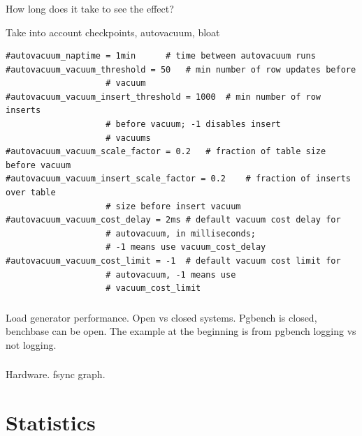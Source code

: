 \documentclass[usenames,dvipsnames, 18pt, compress, aspectratio=169]{beamer}
\begin{document}
\begin{frame}[fragile]{}
    \frametitle{}
    \begin{center}
        How long does it take to see the effect?

        Take into account checkpoints, autovacuum, bloat

        \begin{verbatim}
#autovacuum_naptime = 1min		# time between autovacuum runs
#autovacuum_vacuum_threshold = 50	# min number of row updates before
                    # vacuum
#autovacuum_vacuum_insert_threshold = 1000	# min number of row inserts
                    # before vacuum; -1 disables insert
                    # vacuums
#autovacuum_vacuum_scale_factor = 0.2	# fraction of table size before vacuum
#autovacuum_vacuum_insert_scale_factor = 0.2	# fraction of inserts over table
                    # size before insert vacuum
#autovacuum_vacuum_cost_delay = 2ms	# default vacuum cost delay for
                    # autovacuum, in milliseconds;
                    # -1 means use vacuum_cost_delay
#autovacuum_vacuum_cost_limit = -1	# default vacuum cost limit for
                    # autovacuum, -1 means use
                    # vacuum_cost_limit
        \end{verbatim}

    \end{center}
\end{frame}

\begin{frame}
    \frametitle{}
    \begin{center}
        Load generator performance. Open vs closed systems. Pgbench is closed,
        benchbase can be open. The example at the beginning is from pgbench
        logging vs not logging.
    \end{center}
\end{frame}

\begin{frame}
    \frametitle{}
    \begin{center}
        Hardware. fsync graph.
    \end{center}
\end{frame}

\section{Statistics}
\end{document}
